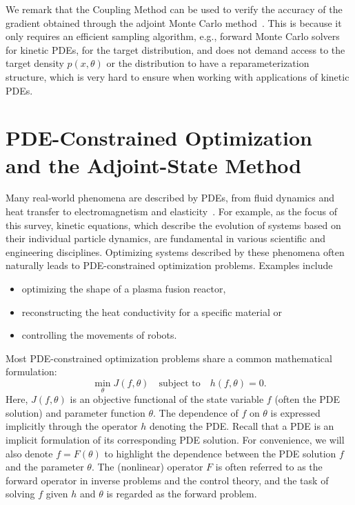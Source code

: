 \documentclass[12pt]{amsart}
\begin{document}
We remark that the Coupling Method can be used to verify the accuracy of the gradient obtained through the adjoint Monte Carlo method~\cite{caflisch2021adjoint}.  This is because it only requires an efficient sampling algorithm, e.g., forward Monte Carlo solvers for kinetic PDEs,  for the target distribution, and does not demand access to the target density $p(x,\theta)$ or the distribution to have a reparameterization structure,  which is very hard to ensure when working with applications of kinetic PDEs. 













\section{PDE-Constrained Optimization and the Adjoint-State Method}\label{sec:PDE-constrained}

Many real-world phenomena are described by PDEs, from fluid dynamics and heat transfer to electromagnetism and elasticity~\cite{borzi2011computational}. For example, as the focus of this survey, kinetic equations, which describe the evolution of systems based on their individual particle dynamics, are fundamental in various scientific and engineering disciplines. 
Optimizing systems described by these phenomena often naturally leads to PDE-constrained optimization problems. Examples include
\begin{itemize}
    \item optimizing the shape of a plasma fusion reactor,
    \item reconstructing the heat conductivity for a specific material or
    \item controlling the movements of robots.
\end{itemize}




Most PDE-constrained optimization problems share a common mathematical formulation:
\begin{equation}\label{eq:PDE-OPT}
    \min_{\theta} J(f,\theta)\quad \text{subject to}\quad h(f,\theta) = 0.
\end{equation}
Here, $J(f,\theta)$ is an objective functional of the state variable $f$ (often the PDE solution) and parameter function $\theta$. The dependence of  $f$ on $\theta$ is expressed implicitly through the operator $h$ denoting the PDE. Recall that a  PDE is an implicit formulation of its corresponding PDE solution. For convenience, we will also denote  $f = F(\theta)$ to highlight the dependence between the PDE solution $f$ and the parameter $\theta$. The (nonlinear) operator $F$ is often referred to as the forward operator in inverse problems and the control theory, and the task of solving $f$ given $h$ and $\theta$ is regarded as the forward problem.
\end{document}
